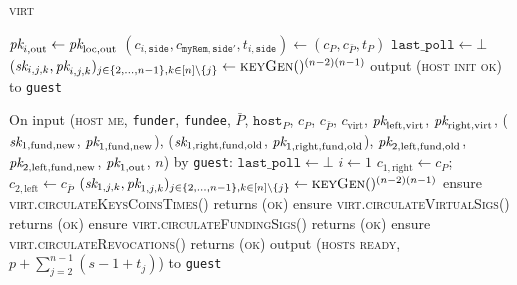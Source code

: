 \begin{center}
\begin{processbox}{\textsc{virt}}
\begin{algorithmic}[1]
          \State $\textit{pk}_{i, \mathrm{out}} \gets \textit{pk}_{\mathrm{loc}, \mathrm{out}}$
        \EndIf \: 
        \State $(c_{i, \texttt{side}}, c_{\texttt{myRem}, \texttt{side}'}, t_{i,
        \texttt{side}}) \gets (c_P, c_{\bar{P}}, t_P)$
        \State $\texttt{last\_poll} \gets \bot$
          \State $(\textit{sk}_{i, j, k}, \textit{pk}_{i, j, k})_{j \in \{2, \dots, n-1\}, k \in
          [n] \setminus \{j\}} \gets \textsc{keyGen}()^{(n-2)(n-1)}$
        \EndIf
        \State output (\textsc{host init ok}) to \texttt{guest}
      \EndIndent
      \Statex

      \State On input (\textsc{host me}, \texttt{funder}, \texttt{fundee},
      $\bar{P}$, $\texttt{host}_P$, $c_P$, $c_{\bar{P}}$, $c_{\mathrm{virt}}$,
      $\textit{pk}_{\mathrm{left}, \mathrm{virt}}$, $\textit{pk}_{\mathrm{right}, \mathrm{virt}}$,
      ($\textit{sk}_{1, \mathrm{fund}, \mathrm{new}}$, $\textit{pk}_{1, \mathrm{fund},
      \mathrm{new}}$), ($\textit{sk}_{1, \mathrm{right}, \mathrm{fund}, \mathrm{old}}$,
      $\textit{pk}_{1, \mathrm{right}, \mathrm{fund}, \mathrm{old}}$), $\textit{pk}_{2,
      \mathrm{left}, \mathrm{fund}, \mathrm{old}}$, $\textit{pk}_{2, \mathrm{left},
      \mathrm{fund}, \mathrm{new}}$, $\textit{pk}_{1, \mathrm{out}}$, $n$) by
      \texttt{guest}:
      \Indent
        \State $\texttt{last\_poll} \gets \bot$
        \State $i \gets 1$
        \State $c_{1, \mathrm{right}} \gets c_P$; $c_{2, \mathrm{left}} \gets
        c_{\bar{P}}$
        \label{code:virtual-layer:keys:host-me:set-i}
        \State $(\textit{sk}_{1, j, k}, \textit{pk}_{1, j, k})_{j \in \{2, \dots, n-1\}, k \in [n]
        \setminus \{j\}} \gets \textsc{keyGen}()^{(n-2)(n-1)}$
        \State ensure \textsc{virt.circulateKeysCoinsTimes}() returns
        (\textsc{ok})
        \State ensure \textsc{virt.circulateVirtualSigs}() returns (\textsc{ok})
        \State ensure \textsc{virt.circulateFundingSigs}() returns (\textsc{ok})
        \State ensure \textsc{virt.circulateRevocations}() returns (\textsc{ok})
        \State output (\textsc{hosts ready}, $p + \sum\limits_{j = 2}^{n-1}(s -
        1 + t_j)$) to \texttt{guest} 
      \EndIndent
    \end{algorithmic}
  \end{processbox}
  \label{code:virtual-layer:keys}
\end{center} \ \\

